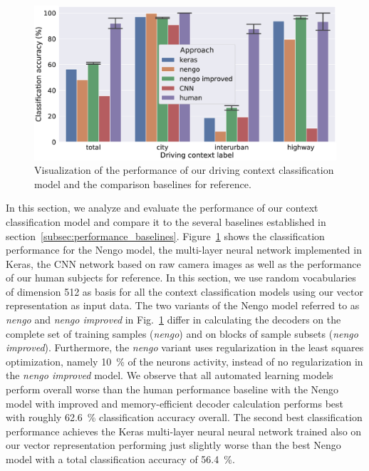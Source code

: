 \begin{figure}[t]
    \centering
    \includegraphics[width=1.\linewidth]{imgs/context_class_approaches.eps}
    \caption{Visualization of the performance of our driving context classification model and the comparison baselines for reference.}
    \label{fig:context_class_approaches}
\end{figure}

In this section, we analyze and evaluate the performance of our context classification model and compare it to the several baselines established in section~\ref{subsec:performance_baselines}.
Figure~\ref{fig:context_class_approaches} shows the classification performance for the \ac{Nengo} model, the multi-layer neural network implemented in Keras, the \ac{CNN} network based on raw camera images as well as the performance of our human subjects for reference.
In this section, we use random vocabularies of dimension \num{512} as basis for all the context classification models using our vector representation as input data.
The two variants of the \ac{Nengo} model referred to as \emph{nengo} and \emph{nengo improved} in Fig.~\ref{fig:context_class_approaches} differ in calculating the decoders on the complete set of training samples (\emph{nengo}) and on blocks of sample subsets (\emph{nengo improved}).
Furthermore, the \emph{nengo} variant uses regularization in the least squares optimization, namely \SI{10}{\percent} of the neurons activity, instead of no regularization in the \emph{nengo improved} model.
We observe that all automated learning models perform overall worse than the human performance baseline with the \ac{Nengo} model with improved and memory-efficient decoder calculation performs best with roughly \SI{62.6}{\percent} classification accuracy overall.
The second best classification performance achieves the Keras multi-layer neural neural network trained also on our vector representation performing just slightly worse than the best \ac{Nengo} model with a total classification accuracy of \SI{56.4}{\percent}.

